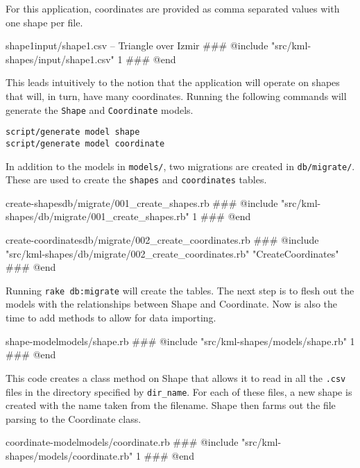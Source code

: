\documentclass[12pt]{article}
\begin{document}
For this application, coordinates are provided as comma separated values with one shape per file. 

\pagebreak

\begin{code}{shape1}{input/shape1.csv -- Triangle over Izmir}
### @include "src/kml-shapes/input/shape1.csv" 1
### @end
\end{code}

This leads intuitively to the notion that the application will operate on shapes that will, in turn, have many coordinates. Running the following commands will generate the \texttt{Shape} and \texttt{Coordinate} models.  

\begin{Verbatim}
script/generate model shape
script/generate model coordinate
\end{Verbatim}

In addition to the models in \texttt{models/}, two migrations are created in \texttt{db/migrate/}. These are used to create the \texttt{shapes} and \texttt{coordinates} tables.

\begin{code}{create-shapes}{db/migrate/001\_create\_shapes.rb}
### @include "src/kml-shapes/db/migrate/001_create_shapes.rb" 1
### @end
\end{code}

\begin{code}{create-coordinates}{db/migrate/002\_create\_coordinates.rb}
### @include "src/kml-shapes/db/migrate/002_create_coordinates.rb" "CreateCoordinates"
### @end
\end{code}

Running \texttt{rake db:migrate} will create the tables.  The next step is to flesh out the models with the relationships between Shape and Coordinate.  Now is also the time to add methods to allow for data importing.

\begin{code}{shape-model}{models/shape.rb}
### @include "src/kml-shapes/models/shape.rb" 1
### @end
\end{code}

This code creates a class method on Shape that allows it to read in all the \texttt{.csv} files in the directory specified by \texttt{dir\_name}.  For each of these files, a new shape is created with the name taken from the filename.  Shape then farms out the file parsing to the Coordinate class.

\begin{code}{coordinate-model}{models/coordinate.rb}
### @include "src/kml-shapes/models/coordinate.rb" 1
### @end
\end{code}
\end{document}
